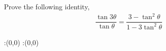 
%
%
%
%
% 
% 

\question[3] Prove the following identity,
\begin{align}
  \dfrac{\tan3\theta}{\tan\theta} 
    = \dfrac{3-\tan^2\theta}{1-3\tan^2\theta} \nonumber
\end{align} 


\ifprintanswers
  \begin{marginfigure}
      :(0,0)
      :(0,0)
    \figdrawbegin{}
      \figdrawline [100,101]
    \figdrawend
    \figvisu{\figBoxA}{}{%
    }
    \centerline{\box\figBoxA}
  \end{marginfigure}
\fi 


